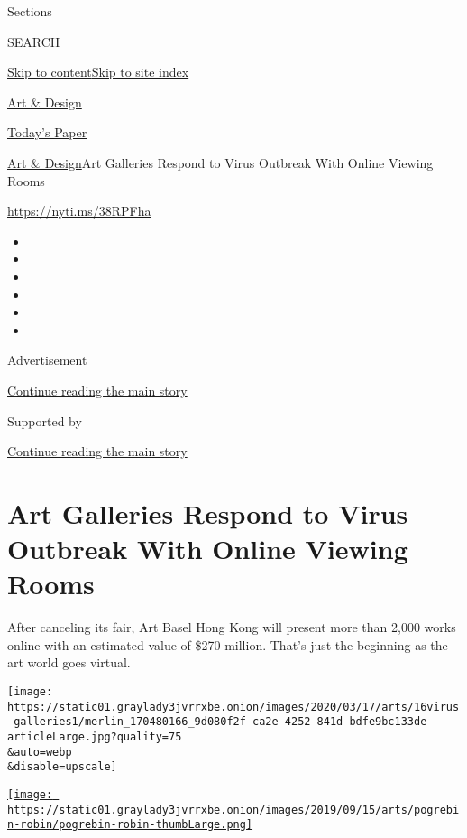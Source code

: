 Sections

SEARCH

\protect\hyperlink{site-content}{Skip to
content}\protect\hyperlink{site-index}{Skip to site index}

\href{https://www.nytimes3xbfgragh.onion/section/arts/design}{Art \&
Design}

\href{https://myaccount.nytimes3xbfgragh.onion/auth/login?response_type=cookie\&client_id=vi}{}

\href{https://www.nytimes3xbfgragh.onion/section/todayspaper}{Today's
Paper}

\href{/section/arts/design}{Art \& Design}\textbar{}Art Galleries
Respond to Virus Outbreak With Online Viewing Rooms

\url{https://nyti.ms/38RPFha}

\begin{itemize}
\item
\item
\item
\item
\item
\item
\end{itemize}

Advertisement

\protect\hyperlink{after-top}{Continue reading the main story}

Supported by

\protect\hyperlink{after-sponsor}{Continue reading the main story}

\hypertarget{art-galleries-respond-to-virus-outbreak-with-online-viewing-rooms}{%
\section{Art Galleries Respond to Virus Outbreak With Online Viewing
Rooms}\label{art-galleries-respond-to-virus-outbreak-with-online-viewing-rooms}}

After canceling its fair, Art Basel Hong Kong will present more than
2,000 works online with an estimated value of \$270 million. That's just
the beginning as the art world goes virtual.

\texttt{[image: https://static01.graylady3jvrrxbe.onion/images/2020/03/17/arts/16virus-galleries1/merlin\_170480166\_9d080f2f-ca2e-4252-841d-bdfe9bc133de-articleLarge.jpg?quality=75\\\&auto=webp\\\&disable=upscale]}

\href{https://www.nytimes3xbfgragh.onion/by/robin-pogrebin}{\texttt{[image: https://static01.graylady3jvrrxbe.onion/images/2019/09/15/arts/pogrebin-robin/pogrebin-robin-thumbLarge.png]}}

